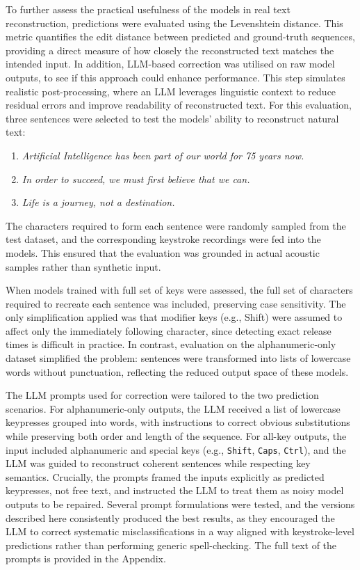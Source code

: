 \documentclass[a4paper,11pt,twoside]{report}
\theoremstyle{definition}
\begin{document}
To further assess the practical usefulness of the models in real text reconstruction, predictions were evaluated using the Levenshtein distance. This metric quantifies the edit distance between predicted and ground-truth sequences, providing a direct measure of how closely the reconstructed text matches the intended input. In addition, LLM-based correction was utilised on raw model outputs, to see if this approach could enhance performance. This step simulates realistic post-processing, where an LLM leverages linguistic context to reduce residual errors and improve readability of reconstructed text.
\newpage
For this evaluation, three sentences were selected to test the models’ ability to reconstruct natural text:
\begin{enumerate}
  \item \textit{Artificial Intelligence has been part of our world for 75 years now.}
  \item \textit{In order to succeed, we must first believe that we can.}
  \item \textit{Life is a journey, not a destination.}
\end{enumerate}
The characters required to form each sentence were randomly sampled from the test dataset, and the corresponding keystroke recordings were fed into the models. This ensured that the evaluation was grounded in actual acoustic samples rather than synthetic input.

When models trained with full set of keys were assessed, the full set of characters required to recreate each sentence was included, preserving case sensitivity. The only simplification applied was that modifier keys (e.g., Shift) were assumed to affect only the immediately following character, since detecting exact release times is difficult in practice. In contrast, evaluation on the alphanumeric-only dataset simplified the problem: sentences were transformed into lists of lowercase words without punctuation, reflecting the reduced output space of these models.

The LLM prompts used for correction were tailored to the two prediction scenarios. For alphanumeric-only outputs, the LLM received a list of lowercase keypresses grouped into words, with instructions to correct obvious substitutions while preserving both order and length of the sequence. For all-key outputs, the input included alphanumeric and special keys (e.g., \texttt{Shift}, \texttt{Caps}, \texttt{Ctrl}), and the LLM was guided to reconstruct coherent sentences while respecting key semantics. Crucially, the prompts framed the inputs explicitly as predicted keypresses, not free text, and instructed the LLM to treat them as noisy model outputs to be repaired. Several prompt formulations were tested, and the versions described here consistently produced the best results, as they encouraged the LLM to correct systematic misclassifications in a way aligned with keystroke-level predictions rather than performing generic spell-checking. The full text of the prompts is provided in the Appendix.
\end{document}
